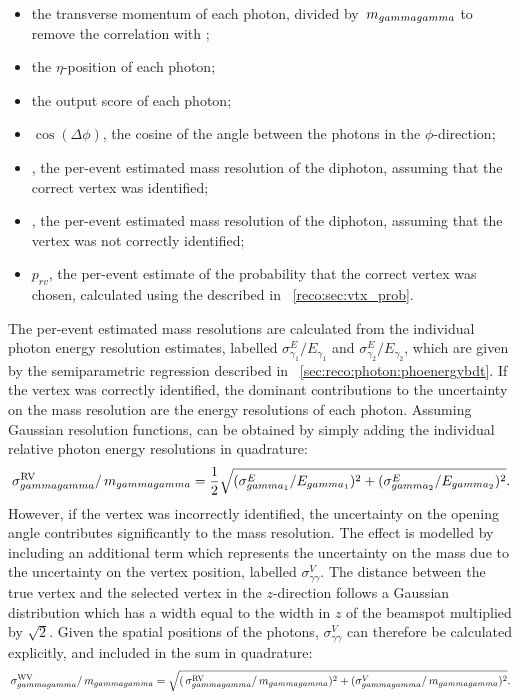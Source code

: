 \begin{itemize}
\item the transverse momentum of each photon, divided by $\,m_{gammagamma}$ to remove the correlation with \mH;
\item the $\eta$-position of each photon;
\item the \PhoIdBdt output score of each photon;
\item $\cos(\Delta\phi)$, the cosine of the angle between the photons in the $\phi$-direction;
\item \sigmarv, the per-event estimated mass resolution of the diphoton, assuming that the correct vertex was identified;
\item \sigmawv, the per-event estimated mass resolution of the diphoton, assuming that the vertex was not correctly identified;
\item $p_{rv}$, the per-event estimate of the probability that the correct vertex was chosen, calculated using the \VtxProbBdt described in \Sec~\ref{reco:sec:vtx_prob}.
\end{itemize}

The per-event estimated mass resolutions are calculated from the individual photon energy resolution estimates, labelled $\sigma^E_{\gamma_1}/E_{\gamma_1}$ and $\sigma^E_{\gamma_2}/E_{\gamma_2}$, which are given by the semiparametric regression \PhoEnergyBdt described in \Sec~\ref{sec:reco:photon:phoenergybdt}. If the vertex was correctly identified, the dominant contributions to the uncertainty on the mass resolution are the energy resolutions of each photon. Assuming Gaussian resolution functions, \sigmarv can be obtained by simply adding the individual relative photon energy resolutions in quadrature:
\begin{equation}
\,\sigma^\text{RV}_{gammagamma}/\,m_{gammagamma}= \frac{1}{2} \sqrt{({\sigma^E_{gamma_1}}/{E_{gamma_1}})^2 +({\sigma^E_{gamma_2}}/{E_{gamma_2}})^2 }.
\end{equation} 
However, if the vertex was incorrectly identified, the uncertainty on the opening angle contributes significantly to the mass resolution. The effect is modelled by including an additional term which represents the uncertainty on the mass due to the uncertainty on the vertex position, labelled $\sigma^V_{\gamma\gamma}$. The distance between the true vertex and the selected vertex in the $z$-direction follows a Gaussian distribution which has a width equal to the width in $z$ of the beamspot multiplied by $\sqrt{2}$. Given the spatial positions of the photons, $\sigma^V_{\gamma\gamma}$ can therefore be calculated explicitly, and included in the sum in quadrature:
\begin{equation}
\,\sigma^\text{WV}_{gammagamma}/\,m_{gammagamma}= \sqrt{(\,\sigma^\text{RV}_{gammagamma}/\,m_{gammagamma})^2 +(\sigma^V_{gammagamma}/\,m_{gammagamma})^2 }.
\end{equation} 


